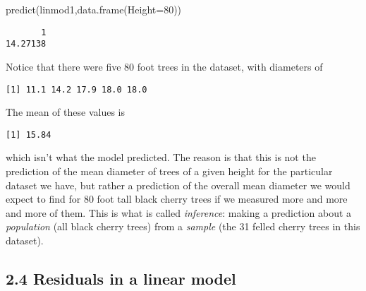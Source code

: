 \documentclass[
]{article}
\newenvironment{Shaded}{\begin{snugshade}}{\end{snugshade}}
\newcommand{\AttributeTok}[1]{\textcolor[rgb]{0.77,0.63,0.00}{#1}}
\newcommand{\DecValTok}[1]{\textcolor[rgb]{0.00,0.00,0.81}{#1}}
\newcommand{\FunctionTok}[1]{\textcolor[rgb]{0.00,0.00,0.00}{#1}}
\newcommand{\NormalTok}[1]{#1}
\newcommand{\SpecialCharTok}[1]{\textcolor[rgb]{0.00,0.00,0.00}{#1}}
\begin{document}
\begin{Shaded}
\begin{Highlighting}[]
\FunctionTok{predict}\NormalTok{(linmod1,}\FunctionTok{data.frame}\NormalTok{(}\AttributeTok{Height=}\DecValTok{80}\NormalTok{))}
\end{Highlighting}
\end{Shaded}

\begin{verbatim}
       1 
14.27138 
\end{verbatim}

Notice that there were five 80 foot trees in the dataset, with diameters
of

\begin{Shaded}
\end{Shaded}

\begin{verbatim}
[1] 11.1 14.2 17.9 18.0 18.0
\end{verbatim}

The mean of these values is

\begin{Shaded}
\end{Shaded}

\begin{verbatim}
[1] 15.84
\end{verbatim}

which isn't what the model predicted. The reason is that this is not the
prediction of the mean diameter of trees of a given height for the
particular dataset we have, but rather a prediction of the overall mean
diameter we would expect to find for 80 foot tall black cherry trees if
we measured more and more and more of them. This is what is called
\emph{inference}: making a prediction about a \emph{population} (all
black cherry trees) from a \emph{sample} (the 31 felled cherry trees in
this dataset).

\hypertarget{residuals-in-a-linear-model}{%
\subsection{2.4 Residuals in a linear
model}\label{residuals-in-a-linear-model}}
\end{document}
